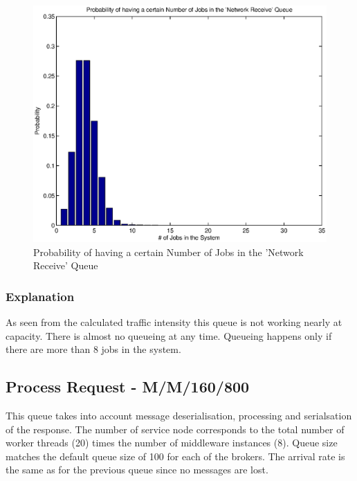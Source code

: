 \documentclass[a4paper]{article}
\begin{document}
\begin{figure}[H]
	\begin{center}
    \includegraphics[scale=0.6]{../plots-ms2-mg/queueanalysis-1NwReceive.eps}
  \end{center}
  \caption{Probability of having a certain Number of Jobs in the 'Network Receive' Queue}
  \label{fig:queueanalysis1}
\end{figure}


\subsubsection{Explanation}

As seen from the calculated traffic  intensity this queue is not working nearly at capacity. There is almost no queueing at any time. Queueing happens only if there are more than 8 jobs in the system.

\subsection{Process Request - M/M/160/800}
This queue takes into account message deserialisation, processing and serialsation of the response. The number of service node corresponds to the total number of worker threads (20) times the number of middleware instances (8). Queue size matches the default queue size of 100 for each of the brokers. The arrival rate is the same as for the previous queue since no messages are lost.\\
\end{document}
